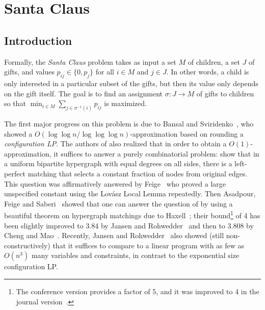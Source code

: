 \chapter{Santa Claus}\label{chapter: SC}

\section{Introduction}

Formally, the \emph{Santa Claus} problem takes as input a set $M$ of children, a set $J$ of gifts,
and values $p_{ij} \in \{ 0,p_j\}$ for all $i \in M$ and $j \in J$. In other words, a child is
only interested in a particular subset of the gifts, but then its value only depends on the
gift itself. The goal is to find an assignment $\sigma : J \to M$ of gifts to children so that
$
  \min_{i \in M} \sum_{j \in \sigma^{-1}(i)} p_{ij}
$
is maximized.

The first major progress on this problem is due to Bansal and Sviridenko~\cite{SantaClaus-BansalSviridenko-STOC2006}, who showed a $O(\log \log n / \log \log \log n)$-approximation based on rounding a \emph{configuration LP}. The authors of \cite{SantaClaus-BansalSviridenko-STOC2006} also realized that in order to obtain a $O(1)$-approximation, it suffices to answer 
a purely combinatorial problem: show that
in a uniform bipartite hypergraph with equal degrees on all sides, there is a left-perfect matching that selects a constant fraction of nodes from original edges.
This question was affirmatively answered by Feige~\cite{ConstantIntegralityGapSantaClaus-Feige-SODA2008} who proved a large unspecified constant using the Lov{\'a}sz Local Lemma repeatedly.
Then Asadpour, Feige and Saberi~\cite{SantaClaus-AsadpourFeigeSaberi-APPROX2008} showed that
one can answer the question of \cite{SantaClaus-BansalSviridenko-STOC2006} by using a beautiful
theorem on hypergraph matchings due to Haxell~\cite{HypergraphMatchingsHaxell95}; 
their bound\footnote{The conference version \cite{SantaClaus-AsadpourFeigeSaberi-APPROX2008} provides a factor of 5, and it was improved to 4 in the journal version~\cite{SantaClaus-AsadpourFeigeSaberi-Journal-TALG2012}.} of 4 has been slightly improved to 3.84 by Jansen and Rohwedder~\cite{ConfigurationLP-for-SantaClaus-has-gap-atmost3.84-Arxiv2018} and then to 3.808 by Cheng and Mao~\cite{CM19}.
Recently, Jansen and Rohwedder~\cite{CompactLPforAllocationProblems-JansenRohwedder-SOSA18} also showed (still non-constructively) that it suffices to compare to a linear program with as few as $O(n^3)$ many variables and constraints, in contrast to the exponential size configuration LP.

